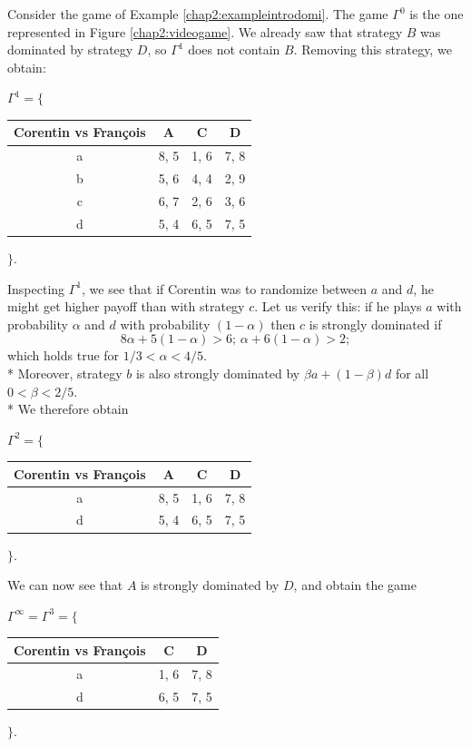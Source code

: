 \begin{example}
Consider the game of Example \ref{chap2:exampleintrodomi}.
The game $\Gamma^0$ is the one represented in Figure \ref{chap2:videogame}.
We already saw that strategy $B$ was dominated by strategy $D$, so $\Gamma^1$ does not contain $B$. Removing this strategy, we obtain:
\begin{center}
$\Gamma^1 = \Bigg \{$
\begin{tabular}{c|ccc}
  Corentin vs Fran\c{c}ois &  A   & C & D\\
\hline a & 8, 5  & 1, 6 & 7, 8 \\
 b & 5, 6  & 4, 4 & 2, 9 \\
 c & 6, 7  & 2, 6 & 3, 6 \\
 d & 5, 4  & 6, 5 & 7, 5 \\
\end{tabular}
$\Bigg \}.$
\end{center}

Inspecting $\Gamma^1$, we see that if Corentin was to randomize between $a$ and $d$, he might get higher payoff than with strategy $c$.
Let us verify this: if he plays $a$ with probability $\alpha$ and $d$ with probability $(1-\alpha)$ then $c$ is strongly dominated if
$$ 8\alpha + 5(1-\alpha) > 6; \, \alpha + 6(1-\alpha) > 2; $$
which holds true for $ 1/3 < \alpha < 4/5$.\\*
Moreover, strategy $b$ is also strongly dominated by $\beta a + (1-\beta) d$ for all $ 0 < \beta < 2 /5$.\\*
We therefore obtain
\begin{center}
$\Gamma^2 = \Bigg \{$
\begin{tabular}{c|ccc}
  Corentin vs Fran\c{c}ois &  A   & C & D\\
\hline a & 8, 5  & 1, 6 & 7, 8 \\
 d & 5, 4  & 6, 5 & 7, 5 \\
\end{tabular}
$\Bigg \}.$
\end{center}

We can now see that $A$ is strongly dominated by $D$, and obtain the game
\begin{center}
$\Gamma^{\infty}  = \Gamma^3 = \Bigg \{$
\begin{tabular}{c|cc}
  Corentin vs Fran\c{c}ois   & C & D\\
\hline a  & 1, 6 & 7, 8 \\
 d   & 6, 5 & 7, 5 \\
\end{tabular}
$\Bigg \}.$
\end{center}


\end{example}
